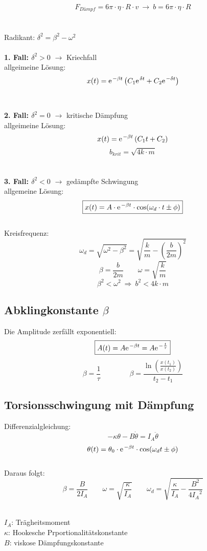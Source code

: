 \[
	F_{Dämpf} = 6\pi \cdot \eta \cdot R \cdot v \ \rightarrow \ b = 6\pi \cdot \eta \cdot R
\]
\\
\\
Radikant: $\delta^2 = \beta^2 - \omega^2$
\\\\
\textbf{1. Fall: $\delta^2 > 0$} $\rightarrow$ Kriechfall\\
allgeimeine Lösung:
\[
	x(t) = \mathrm{e\;\!}^{-\beta t} \left( C_1 \mathrm{e\;\!}^{\delta t} + C_2 \mathrm{e\;\!}^{-\delta t} \right)
\]
\\\\
\textbf{2. Fall: $\delta^2 = 0$} $\rightarrow$ kritische Dämpfung\\
allgeimeine Lösung:
\[
	x(t) = \mathrm{e\;\!}^{-\beta t} \left( C_1 t + C_2 \right)
\]
\[
	b_{krit} = \sqrt{4k\cdot m}
\]
\\\\
\textbf{3. Fall: $\delta^2 < 0$} $\rightarrow$ gedämpfte Schwingung\\
allgemeine Lösung:
\[\boxed{
	x(t)=A \cdot \mathrm{e\;\!}^{-\beta t} \cdot \cos(\omega_d \cdot t \pm \phi)
}\]
\\
Kreisfrequenz:
\[\boxed{
	\omega_d = \sqrt{\omega^2 - \beta^2} = \sqrt{\frac{k}{m} - \left( \frac{b}{2m} \right)^2}
}\]
\[
	\beta=\frac{b}{2m} \qquad \omega = \sqrt{\frac{k}{m}}
\]
\[
	\beta^2 < \omega^2 \ \Rightarrow \ b^2 < 4k \cdot m
\]

\subsection{Abklingkonstante $\beta$}
Die Amplitude zerfällt exponentiell:
\[\boxed{
	A(t) = A \mathrm{e\;\!}^{-\beta t} = A \mathrm{e\;\!}^{-\frac{t}{\tau}}
}\]
\[
	\beta = \frac{1}{\tau} \qquad\qquad \beta = \frac{\ln \left( \frac{x(t_1)}{x(t_2)} \right)}{t_2-t_1}
\]


\subsection{Torsionsschwingung mit Dämpfung}
Differenzialgleichung:
\[
	-\kappa\theta-B\dot{\theta} = I_A \ddot{\theta}
\]
\[
	\theta(t) = \theta_0 \cdot \mathrm{e\;\!}^{-\beta t} \cdot \cos(\omega_d t \pm \phi)
\]
\\
Daraus folgt:
\[
	\beta = \frac{B}{2I_A} \qquad \omega = \sqrt{\frac{\kappa}{I_A}} \qquad \omega_d = \sqrt{\frac{\kappa}{I_A} - \frac{B^2}{4{I_A}^2}}
\]
\\
\begin{footnotesize}
	$I_{A}$: Trägheitsmoment\\
	$\kappa$: Hookesche Prportionalitätskonstante \\
	$B$: viskose Dämpfungskonstante
\end{footnotesize}


